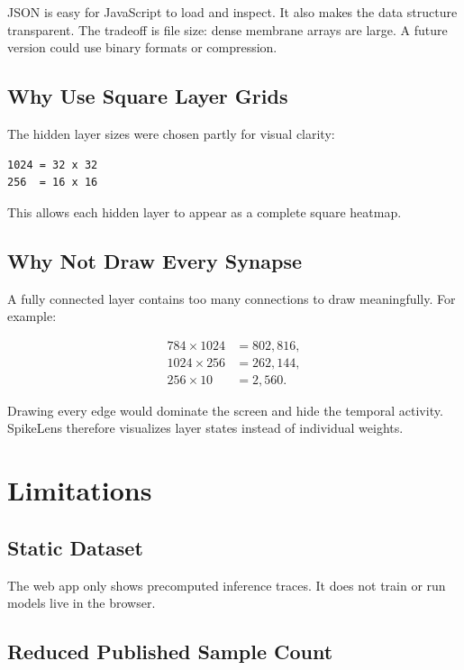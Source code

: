 \documentclass[11pt,a4paper]{article}
\newcommand{\projecttitle}{SpikeLens}
\begin{document}
JSON is easy for JavaScript to load and inspect. It also makes the data structure transparent. The tradeoff is file size: dense membrane arrays are large. A future version could use binary formats or compression.

\subsection{Why Use Square Layer Grids}

The hidden layer sizes were chosen partly for visual clarity:

\begin{lstlisting}
1024 = 32 x 32
256  = 16 x 16
\end{lstlisting}

This allows each hidden layer to appear as a complete square heatmap.

\subsection{Why Not Draw Every Synapse}

A fully connected layer contains too many connections to draw meaningfully. For example:

\begin{align}
784 \times 1024 &= 802{,}816, \\
1024 \times 256 &= 262{,}144, \\
256 \times 10 &= 2{,}560.
\end{align}

Drawing every edge would dominate the screen and hide the temporal activity. \projecttitle{} therefore visualizes layer states instead of individual weights.

\section{Limitations}

\subsection{Static Dataset}

The web app only shows precomputed inference traces. It does not train or run models live in the browser.

\subsection{Reduced Published Sample Count}
\end{document}
